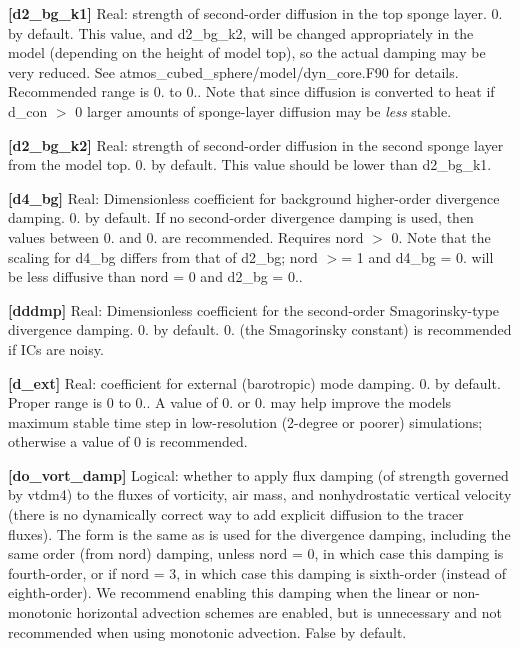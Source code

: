 {\bfseries \mbox{[}d2\+\_\+bg\+\_\+k1\mbox{]}} Real\+: strength of second-\/order diffusion in the top sponge layer. 0. by default. This value, and d2\+\_\+bg\+\_\+k2, will be changed appropriately in the model (depending on the height of model top), so the actual damping may be very reduced. See atmos\+\_\+cubed\+\_\+sphere/model/dyn\+\_\+core.\+F90 for details. Recommended range is 0. to 0.. Note that since diffusion is converted to heat if d\+\_\+con $>$ 0 larger amounts of sponge-\/layer diffusion may be {\itshape less} stable.

{\bfseries \mbox{[}d2\+\_\+bg\+\_\+k2\mbox{]}} Real\+: strength of second-\/order diffusion in the second sponge layer from the model top. 0. by default. This value should be lower than d2\+\_\+bg\+\_\+k1.

{\bfseries \mbox{[}d4\+\_\+bg\mbox{]}} Real\+: Dimensionless coefficient for background higher-\/order divergence damping. 0. by default. If no second-\/order divergence damping is used, then values between 0. and 0. are recommended. Requires nord $>$ 0. Note that the scaling for d4\+\_\+bg differs from that of d2\+\_\+bg; nord $>$= 1 and d4\+\_\+bg = 0. will be less diffusive than nord = 0 and d2\+\_\+bg = 0..

{\bfseries \mbox{[}dddmp\mbox{]}} Real\+: Dimensionless coefficient for the second-\/order Smagorinsky-\/type divergence damping. 0. by default. 0. (the Smagorinsky constant) is recommended if I\+Cs are noisy.

{\bfseries \mbox{[}d\+\_\+ext\mbox{]}} Real\+: coefficient for external (barotropic) mode damping. 0. by default. Proper range is 0 to 0.. A value of 0. or 0. may help improve the models maximum stable time step in low-\/resolution (2-\/degree or poorer) simulations; otherwise a value of 0 is recommended.

{\bfseries \mbox{[}do\+\_\+vort\+\_\+damp\mbox{]}} Logical\+: whether to apply flux damping (of strength governed by vtdm4) to the fluxes of vorticity, air mass, and nonhydrostatic vertical velocity (there is no dynamically correct way to add explicit diffusion to the tracer fluxes). The form is the same as is used for the divergence damping, including the same order (from nord) damping, unless nord = 0, in which case this damping is fourth-\/order, or if nord = 3, in which case this damping is sixth-\/order (instead of eighth-\/order). We recommend enabling this damping when the linear or non-\/monotonic horizontal advection schemes are enabled, but is unnecessary and not recommended when using monotonic advection. False by default.

